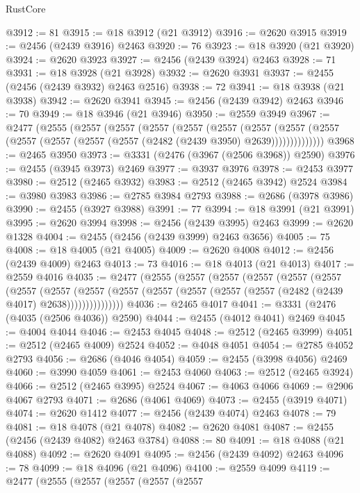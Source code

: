 \begin{lexlean}{RustCore}
\begin{coremodule}
@3912 := 81
@3915 := @18 @3912 (@21 @3912)
@3916 := @2620 @3915
@3919 := @2456 (@2439 @3916) @2463
@3920 := 76
@3923 := @18 @3920 (@21 @3920)
@3924 := @2620 @3923
@3927 := @2456 (@2439 @3924) @2463
@3928 := 71
@3931 := @18 @3928 (@21 @3928)
@3932 := @2620 @3931
@3937 := @2455 (@2456 (@2439 @3932) @2463 @2516)
@3938 := 72
@3941 := @18 @3938 (@21 @3938)
@3942 := @2620 @3941
@3945 := @2456 (@2439 @3942) @2463
@3946 := 70
@3949 := @18 @3946 (@21 @3946)
@3950 := @2559 @3949
@3967 := @2477
    (@2555
      (@2557
        (@2557
          (@2557
            (@2557
              (@2557
                (@2557
                  (@2557 (@2557 (@2557 (@2557 (@2557 (@2557 (@2482 (@2439 @3950) @2639))))))))))))))
@3968 := @2465 @3950
@3973 := @3331 (@2476 (@3967 (@2506 @3968)) @2590)
@3976 := @2455 (@3945 @3973) @2469
@3977 := @3937 @3976
@3978 := @2453 @3977
@3980 := @2512 (@2465 @3932)
@3983 := @2512 (@2465 @3942) @2524
@3984 := @3980 @3983
@3986 := @2785 @3984 @2793
@3988 := @2686 (@3978 @3986)
@3990 := @2455 (@3927 @3988)
@3991 := 77
@3994 := @18 @3991 (@21 @3991)
@3995 := @2620 @3994
@3998 := @2456 (@2439 @3995) @2463
@3999 := @2620 @1328
@4004 := @2455 (@2456 (@2439 @3999) @2463 @3656)
@4005 := 75
@4008 := @18 @4005 (@21 @4005)
@4009 := @2620 @4008
@4012 := @2456 (@2439 @4009) @2463
@4013 := 73
@4016 := @18 @4013 (@21 @4013)
@4017 := @2559 @4016
@4035 := @2477
    (@2555
      (@2557
        (@2557
          (@2557
            (@2557
              (@2557
                (@2557
                  (@2557
                    (@2557
                      (@2557 (@2557 (@2557 (@2557 (@2557 (@2482 (@2439 @4017) @2638)))))))))))))))
@4036 := @2465 @4017
@4041 := @3331 (@2476 (@4035 (@2506 @4036)) @2590)
@4044 := @2455 (@4012 @4041) @2469
@4045 := @4004 @4044
@4046 := @2453 @4045
@4048 := @2512 (@2465 @3999)
@4051 := @2512 (@2465 @4009) @2524
@4052 := @4048 @4051
@4054 := @2785 @4052 @2793
@4056 := @2686 (@4046 @4054)
@4059 := @2455 (@3998 @4056) @2469
@4060 := @3990 @4059
@4061 := @2453 @4060
@4063 := @2512 (@2465 @3924)
@4066 := @2512 (@2465 @3995) @2524
@4067 := @4063 @4066
@4069 := @2906 @4067 @2793
@4071 := @2686 (@4061 @4069)
@4073 := @2455 (@3919 @4071)
@4074 := @2620 @1412
@4077 := @2456 (@2439 @4074) @2463
@4078 := 79
@4081 := @18 @4078 (@21 @4078)
@4082 := @2620 @4081
@4087 := @2455 (@2456 (@2439 @4082) @2463 @3784)
@4088 := 80
@4091 := @18 @4088 (@21 @4088)
@4092 := @2620 @4091
@4095 := @2456 (@2439 @4092) @2463
@4096 := 78
@4099 := @18 @4096 (@21 @4096)
@4100 := @2559 @4099
@4119 := @2477
    (@2555
      (@2557
        (@2557
          (@2557
            (@2557

\end{coremodule}
\end{lexlean}
